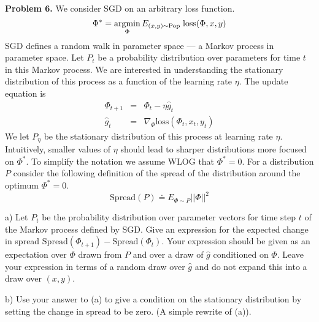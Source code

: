 \documentclass{article}
\begin{document}
{\bf Problem 6.} We consider SGD on an arbitrary loss function.
$$\Phi^* = \operatorname*{argmin}_\Phi E_{(x,y) \sim \mathrm{Pop}}\;\mathrm{loss}(\Phi,x,y)$$
SGD defines a random walk in parameter space --- a Markov process in parameter space.  Let $P_t$ be a probability distribution over parameters
for time $t$ in this Markov process.  We are interested in understanding the stationary distribution of this process as a function of the learning rate $\eta$.
The update equation is
\begin{eqnarray*}
\Phi_{t+1} & = & \Phi_t - \eta \hat{g}_t \\
\hat{g}_t & = & \nabla_\Phi \mathrm{loss}(\Phi_t,x_t,y_t)
\end{eqnarray*}
We let $P_\eta$ be the stationary distribution of this process at learning rate $\eta$.
Intuitively, smaller values of $\eta$ should lead to sharper distributions more focused on $\Phi^*$.
To simplify the notation we assume WLOG that $\Phi^* = 0$.
For a distribution $P$ consider the following definition of the spread of the distribution
around the optimum $\Phi^* = 0$.
$$\mathrm{Spread}(P) \doteq E_{\Phi \sim P} ||\Phi||^2$$

a) Let $P_t$ be the probability distribution over parameter vectors for time step $t$ of the Markov process
defined by SGD.  Give an expression for the expected change in spread $\mathrm{Spread}(\Phi_{t+1}) - \mathrm{Spread}(\Phi_{t})$.
Your expression should be given as an expectation over $\Phi$ drawn from $P$ and over a draw of $\hat{g}$ conditioned on $\Phi$.
Leave your expression in terms of a random draw over $\hat{g}$ and do not expand this into a draw over $(x,y)$.


b) Use your answer to (a) to give a condition on the stationary distribution by setting the change in spread to be zero. (A simple rewrite of (a)).

\end{document}
